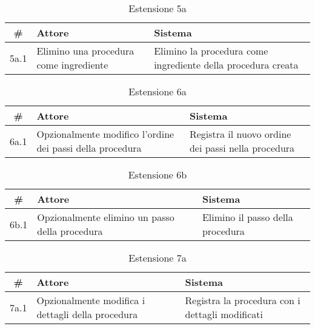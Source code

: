 \begin{table}[H]\centering\caption*{Estensione 5a}
      \small
      \begin{tabular}{|c|p{7cm}|p{6.24cm}|}
            \hline\bfseries \# & \bfseries Attore                       & \bfseries Sistema                                            \\\hline
            5a.1               & Elimino una procedura come ingrediente & Elimino la procedura come ingrediente della procedura creata \\\hline
      \end{tabular}
\end{table}

\begin{table}[H]\centering\caption*{Estensione 6a}
      \small
      \begin{tabular}{|c|p{7cm}|p{6.24cm}|}
            \hline\bfseries \# & \bfseries Attore                                          & \bfseries Sistema                                  \\\hline
            6a.1               & Opzionalmente modifico l’ordine dei passi della procedura & Registra il nuovo ordine dei passi nella procedura \\\hline
      \end{tabular}
\end{table}

\begin{table}[H]\centering\caption*{Estensione 6b}
      \small
      \begin{tabular}{|c|p{7cm}|p{6.24cm}|}
            \hline\bfseries \# & \bfseries Attore                               & \bfseries Sistema                \\\hline
            6b.1               & Opzionalmente elimino un passo della procedura & Elimino il passo della procedura \\\hline
      \end{tabular}
\end{table}

\begin{table}[H]\centering\caption*{Estensione 7a}
      \small
      \begin{tabular}{|c|p{7cm}|p{6.24cm}|}
            \hline\bfseries \# & \bfseries Attore                                  & \bfseries Sistema                               \\\hline
            7a.1               & Opzionalmente modifica i dettagli della procedura & Registra la procedura con i dettagli modificati \\\hline
      \end{tabular}
\end{table}

